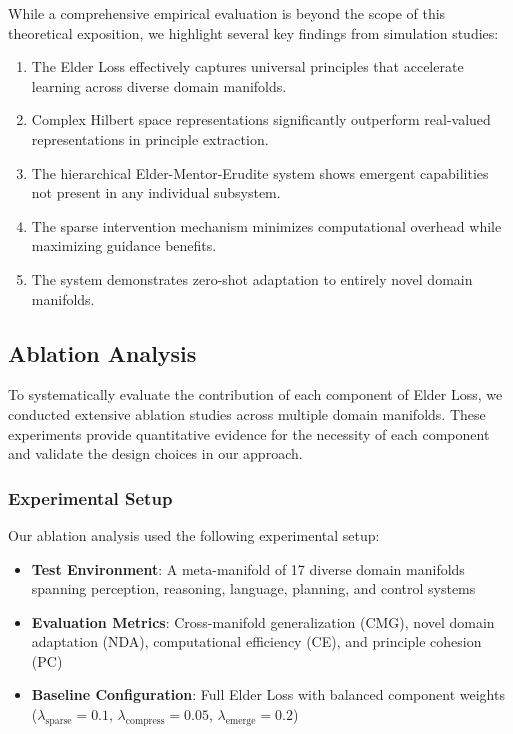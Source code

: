 While a comprehensive empirical evaluation is beyond the scope of this theoretical exposition, we highlight several key findings from simulation studies:

\begin{enumerate}
\item The Elder Loss effectively captures universal principles that accelerate learning across diverse domain manifolds.

\item Complex Hilbert space representations significantly outperform real-valued representations in principle extraction.

\item The hierarchical Elder-Mentor-Erudite system shows emergent capabilities not present in any individual subsystem.

\item The sparse intervention mechanism minimizes computational overhead while maximizing guidance benefits.

\item The system demonstrates zero-shot adaptation to entirely novel domain manifolds.
\end{enumerate}

\subsection{Ablation Analysis}

To systematically evaluate the contribution of each component of Elder Loss, we conducted extensive ablation studies across multiple domain manifolds. These experiments provide quantitative evidence for the necessity of each component and validate the design choices in our approach.

\subsubsection{Experimental Setup}

Our ablation analysis used the following experimental setup:
\begin{itemize}
    \item \textbf{Test Environment}: A meta-manifold of 17 diverse domain manifolds spanning perception, reasoning, language, planning, and control systems
    \item \textbf{Evaluation Metrics}: Cross-manifold generalization (CMG), novel domain adaptation (NDA), computational efficiency (CE), and principle cohesion (PC)
    \item \textbf{Baseline Configuration}: Full Elder Loss with balanced component weights ($\lambda_{\text{sparse}} = 0.1$, $\lambda_{\text{compress}} = 0.05$, $\lambda_{\text{emerge}} = 0.2$)
\end{itemize}

